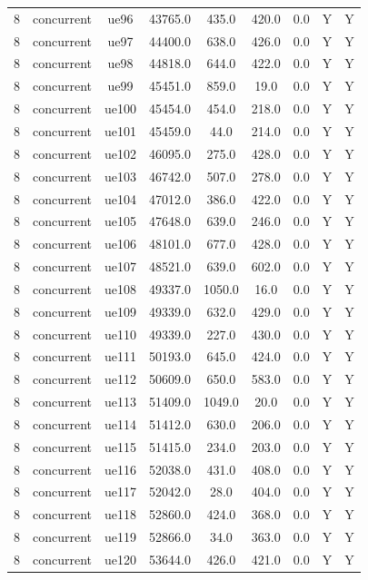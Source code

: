 \begin{table}[ht]
\begin{tabular}{|c|c|c|c|c|c|c|c|c|}
8 & concurrent & ue96 & 43765.0 & 435.0 & 420.0 & 0.0 & Y & Y \\
8 & concurrent & ue97 & 44400.0 & 638.0 & 426.0 & 0.0 & Y & Y \\
8 & concurrent & ue98 & 44818.0 & 644.0 & 422.0 & 0.0 & Y & Y \\
8 & concurrent & ue99 & 45451.0 & 859.0 & 19.0 & 0.0 & Y & Y \\
8 & concurrent & ue100 & 45454.0 & 454.0 & 218.0 & 0.0 & Y & Y \\
8 & concurrent & ue101 & 45459.0 & 44.0 & 214.0 & 0.0 & Y & Y \\
8 & concurrent & ue102 & 46095.0 & 275.0 & 428.0 & 0.0 & Y & Y \\
8 & concurrent & ue103 & 46742.0 & 507.0 & 278.0 & 0.0 & Y & Y \\
8 & concurrent & ue104 & 47012.0 & 386.0 & 422.0 & 0.0 & Y & Y \\
8 & concurrent & ue105 & 47648.0 & 639.0 & 246.0 & 0.0 & Y & Y \\
8 & concurrent & ue106 & 48101.0 & 677.0 & 428.0 & 0.0 & Y & Y \\
8 & concurrent & ue107 & 48521.0 & 639.0 & 602.0 & 0.0 & Y & Y \\
8 & concurrent & ue108 & 49337.0 & 1050.0 & 16.0 & 0.0 & Y & Y \\
8 & concurrent & ue109 & 49339.0 & 632.0 & 429.0 & 0.0 & Y & Y \\
8 & concurrent & ue110 & 49339.0 & 227.0 & 430.0 & 0.0 & Y & Y \\
8 & concurrent & ue111 & 50193.0 & 645.0 & 424.0 & 0.0 & Y & Y \\
8 & concurrent & ue112 & 50609.0 & 650.0 & 583.0 & 0.0 & Y & Y \\
8 & concurrent & ue113 & 51409.0 & 1049.0 & 20.0 & 0.0 & Y & Y \\
8 & concurrent & ue114 & 51412.0 & 630.0 & 206.0 & 0.0 & Y & Y \\
8 & concurrent & ue115 & 51415.0 & 234.0 & 203.0 & 0.0 & Y & Y \\
8 & concurrent & ue116 & 52038.0 & 431.0 & 408.0 & 0.0 & Y & Y \\
8 & concurrent & ue117 & 52042.0 & 28.0 & 404.0 & 0.0 & Y & Y \\
8 & concurrent & ue118 & 52860.0 & 424.0 & 368.0 & 0.0 & Y & Y \\
8 & concurrent & ue119 & 52866.0 & 34.0 & 363.0 & 0.0 & Y & Y \\
8 & concurrent & ue120 & 53644.0 & 426.0 & 421.0 & 0.0 & Y & Y \\

\end{tabular}
\end{table}
